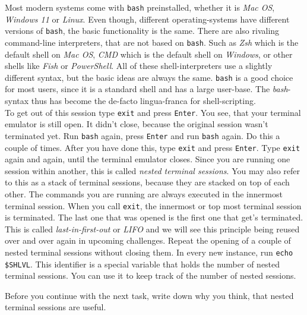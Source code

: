 \begin{challenge}
\begin{task}
        Most modern systems come with \texttt{bash} preinstalled, whether it is \textit{Mac OS}, \textit{Windows 11} or \textit{Linux}.
        Even though, different operating-systems have different versions of \texttt{bash}, the basic functionality is the same.
        There are also rivaling command-line interpreters, that are not based on \texttt{bash}. 
        Such as \textit{Zsh} which is the default shell on \textit{Mac OS}, \textit{CMD} which is the default shell on \textit{Windows}, or other shells like \textit{Fish} or \textit{PowerShell}.
        All of these shell-interpreters use a slightly different syntax, but the basic ideas are always the same.
        \texttt{bash} is a good choice for most users, since it is a standard shell and has a large user-base.
        The \textit{bash}-syntax thus has become the de-facto lingua-franca for shell-scripting.
        \\
        To get out of this session type \texttt{exit} and press \texttt{Enter}.
        You see, that your terminal emulator is still open.
        It didn't close, because the original session wasn't terminated yet. 
        Run \texttt{bash} again, press \texttt{Enter} and run \texttt{bash} again. 
        Do this a couple of times. 
        After you have done this, type \texttt{exit} and press \texttt{Enter}.
        Type \texttt{exit} again and again, until the terminal emulator closes.
        Since you are running one session within another, this is called \textit{nested terminal sessions}.
        You may also refer to this as a stack of terminal sessions, because they are stacked on top of each other.
        The commands you are running are always executed in the innermost terminal session.
        When you call \texttt{exit}, the innermost or top most terminal session is terminated.
        The last one that was opened is the first one that get's terminated.
        This is called \textit{last-in-first-out} or \textit{LIFO} and we will see this principle being reused over and over again in upcoming challenges.
        Repeat the opening of a couple of nested terminal sessions without closing them. 
        In every new instance, run \texttt{echo \$SHLVL}.
        This identifier is a special variable that holds the number of nested terminal sessions.
        You can use it to keep track of the number of nested sessions.
        \begin{questions}
            \item Before you continue with the next task, write down why you think, that nested terminal sessions are useful.
        \end{questions}
    \end{task}


\end{challenge}
